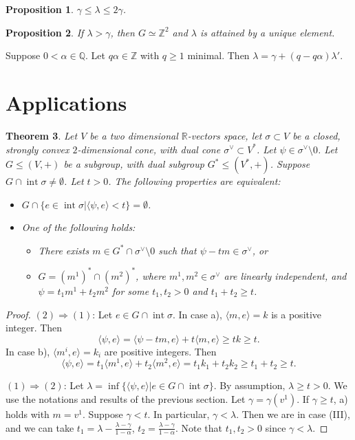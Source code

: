\documentclass[12pt,reqno]{amsart}
\newcommand{\Q}{{\mathbb Q}}
\newcommand{\Z}{{\mathbb Z}}
\newcommand{\R}{{\mathbb R}}
\newcommand{\Int}{\operatorname{int}}
\theoremstyle{plain}
\newtheorem{thm}{Theorem}[section]
\newtheorem{prop}[thm]{Proposition}
\theoremstyle{definition}
\theoremstyle{remark}
\begin{document}
\begin{prop}
$\gamma\le \lambda\le 2\gamma$.
\end{prop}

\begin{prop}
If $\lambda>\gamma$, then $G\simeq \Z^2$ and $\lambda$ is attained
by a unique element.
\end{prop}

 Suppose $0<\alpha\in \Q$. Let $q\alpha\in \Z$ with $q\ge 1$
minimal. Then 
$
\lambda=\gamma+(q-q\alpha)\lambda'.
$


\section{Applications}


\begin{thm}\label{2se}
	Let $V$ be a two dimensional $\R$-vectors space, let $\sigma\subset V$ be a closed, strongly convex $2$-dimensional cone, with dual cone $\sigma^\vee\subset V^*$. Let 
$\psi\in \sigma^\vee\setminus 0$.
Let $G\le (V,+)$ be a subgroup, with dual subgroup $G^*\le (V^*,+)$. Suppose $G\cap \Int \sigma \ne \emptyset$.
Let $t>0$. The following properties are equivalent:
\begin{itemize}
\item[(1)] $G\cap \{e\in \Int \sigma \vert \langle \psi,e\rangle<t\}=\emptyset$.
\item[(2)] One of the following holds:
\begin{itemize}
\item[a)] There exists $m\in G^*\cap \sigma^\vee\setminus 0$ such
that $\psi-tm\in \sigma^\vee$, or
\item[b)] $G=(m^1)^*\cap(m^2)^*$, where $m^1,m^2\in \sigma^\vee$ are
linearly independent, and $\psi=t_1m^1+t_2m^2$ for some
$t_1,t_2>0$ and $t_1+t_2\ge t$.
\end{itemize}
\end{itemize}
\end{thm}

\begin{proof}
$(2)\Longrightarrow(1)$: Let $e\in G\cap \Int \sigma $.
In case a), $\langle m,e\rangle=k$ is a positive integer. Then
$$
\langle \psi,e\rangle =\langle \psi-tm,e\rangle+
t\langle m,e\rangle\ge tk\ge t. 
$$
In case b), $\langle m^i,e\rangle=k_i$ are positive integers.
Then 
$$
\langle \psi,e\rangle =t_1\langle m^1,e\rangle+t_2\langle m^2,e\rangle
=t_1k_1+t_2k_2\ge t_1+t_2\ge t. 
$$

$(1)\Longrightarrow(2)$: Let
$\lambda=\inf\{\langle \psi,e\rangle \vert e\in G\cap \Int \sigma \}$.
By assumption, $\lambda\ge t>0$. We use the notations and results
of the previous section. Let $\gamma=\gamma(v^1)$. If 
$\gamma\ge t$, a) holds with $m=v^1$. Suppose $\gamma<t$.
In particular, $\gamma<\lambda$. Then we are in case (III),
and we can take 
$t_1=\lambda-\frac{\lambda-\gamma}{1-\alpha}$,
$t_2=\frac{\lambda-\gamma}{1-\alpha}$.
Note that $t_1,t_2>0$ since $\gamma<\lambda$.
\end{proof}
\end{document}
